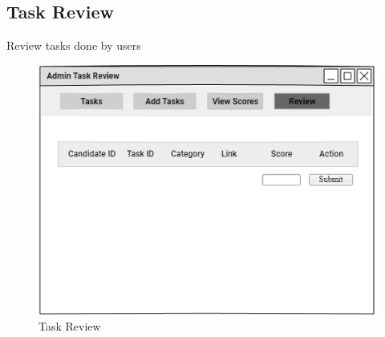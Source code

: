 \documentclass[a4paper,12pt]{report}
\begin{document}
\subsection {Task Review}
Review tasks done by users
\begin{figure}[bph]
	\centering
	\includegraphics[width=.8\linewidth]{img/admin/admintaskreview}
	\caption{Task Review}
\end{figure}

\pagebreak
\end{document}
